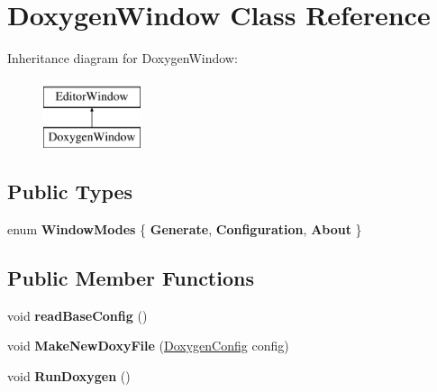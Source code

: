 \hypertarget{class_doxygen_window}{}\section{Doxygen\+Window Class Reference}
\label{class_doxygen_window}


 


Inheritance diagram for Doxygen\+Window\+:\begin{figure}[H]
\begin{center}
\leavevmode
\includegraphics[height=2.000000cm]{class_doxygen_window}
\end{center}
\end{figure}
\subsection*{Public Types}
\begin{DoxyCompactItemize}
\item 
enum {\bfseries Window\+Modes} \{ {\bfseries Generate}, 
{\bfseries Configuration}, 
{\bfseries About}
 \}\hypertarget{class_doxygen_window_ad1f6043062e30f52cb634b72294a5676}{}\label{class_doxygen_window_ad1f6043062e30f52cb634b72294a5676}

\end{DoxyCompactItemize}
\subsection*{Public Member Functions}
\begin{DoxyCompactItemize}
\item 
void {\bfseries read\+Base\+Config} ()\hypertarget{class_doxygen_window_a5ba38d9b1d93fa627bc3b53cdd1dda17}{}\label{class_doxygen_window_a5ba38d9b1d93fa627bc3b53cdd1dda17}

\item 
void {\bfseries Make\+New\+Doxy\+File} (\hyperlink{class_doxygen_config}{Doxygen\+Config} config)\hypertarget{class_doxygen_window_abf3c2a3c3a53e6691e58b865da8404de}{}\label{class_doxygen_window_abf3c2a3c3a53e6691e58b865da8404de}

\item 
void {\bfseries Run\+Doxygen} ()\hypertarget{class_doxygen_window_a63924417d5b5b7a71570ec9a9ef1ca5e}{}\label{class_doxygen_window_a63924417d5b5b7a71570ec9a9ef1ca5e}

\end{DoxyCompactItemize}
